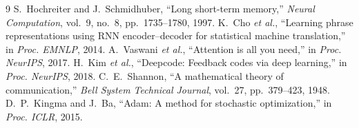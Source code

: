 \documentclass[10pt,twocolumn]{article}
\begin{document}
\begin{thebibliography}{9}
 S.~Hochreiter and J.~Schmidhuber, ``Long short-term memory,''
\emph{Neural Computation}, vol.~9, no.~8, pp.~1735--1780, 1997.
 K.~Cho \emph{et al.}, ``Learning phrase representations using RNN
encoder--decoder for statistical machine translation,'' in \emph{Proc. EMNLP},
2014.
 A.~Vaswani \emph{et al.}, ``Attention is all you need,'' in
\emph{Proc. NeurIPS}, 2017.
 H.~Kim \emph{et al.}, ``Deepcode: Feedback codes via deep
learning,'' in \emph{Proc. NeurIPS}, 2018.
 C.~E.~Shannon, ``A mathematical theory of communication,''
\emph{Bell System Technical Journal}, vol.~27, pp.~379--423, 1948.
 D.~P.~Kingma and J.~Ba, ``Adam: A method for stochastic
optimization,'' in \emph{Proc. ICLR}, 2015.
\end{thebibliography}
\end{document}
